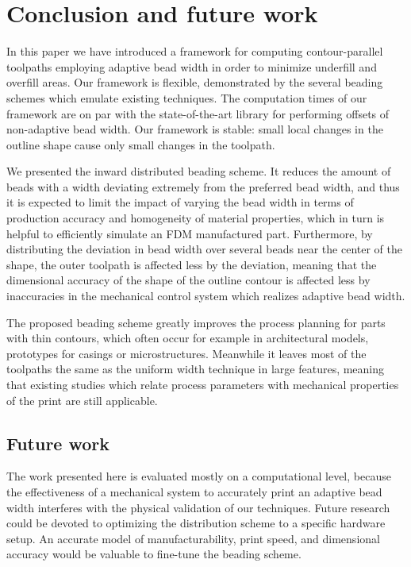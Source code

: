 \section{Conclusion and future work}
In this paper we have introduced a framework for computing contour-parallel toolpaths employing adaptive bead width in order to minimize underfill and overfill areas.
Our framework is flexible, demonstrated by the several beading schemes which emulate existing techniques.
The computation times of our framework are on par with the state-of-the-art library for performing offsets of non-adaptive bead width.
Our framework is stable: small local changes in the outline shape cause only small changes in the toolpath.

We presented the inward distributed beading scheme.
It reduces the amount of beads with a width deviating extremely from the preferred bead width, and thus it is expected to limit the impact of varying the bead width in terms of production accuracy and homogeneity of material properties,
which in turn is helpful to efficiently simulate an FDM manufactured part.
Furthermore, by distributing the deviation in bead width over several beads near the center of the shape, the outer toolpath is affected less by the deviation, meaning that the dimensional accuracy of the shape of the outline contour is affected less by inaccuracies in the mechanical control system which realizes adaptive bead width.

The proposed beading scheme greatly improves the process planning for parts with thin contours, which often occur for example in architectural models, prototypes for casings or microstructures.
Meanwhile it leaves most of the toolpaths the same as the uniform width technique in large features, meaning that existing studies which relate process parameters with mechanical properties of the print are still applicable.


\subsection{Future work}
The work presented here is evaluated mostly on a computational level, because the effectiveness of a mechanical system to accurately print an adaptive bead width interferes with the physical validation of our techniques.
Future research could be devoted to optimizing the distribution scheme to a specific hardware setup.
An accurate model of manufacturability, print speed, and dimensional accuracy would be valuable to fine-tune the beading scheme.

